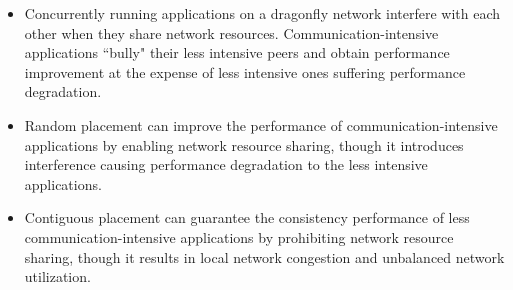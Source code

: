 


\begin{itemize}
   
    \item Concurrently running applications on a dragonfly network interfere with each other when they share network resources. Communication-intensive applications ``bully" their less intensive peers and obtain performance improvement at the expense of less intensive ones suffering performance degradation. 
    
    \item Random placement can improve the performance of communication-intensive applications by enabling network resource sharing, though it introduces interference causing performance degradation to the less intensive applications.
    
    \item Contiguous placement can guarantee the consistency performance of less communication-intensive applications by prohibiting network resource sharing, though it results in local network congestion and unbalanced network utilization.
    
\end{itemize}

